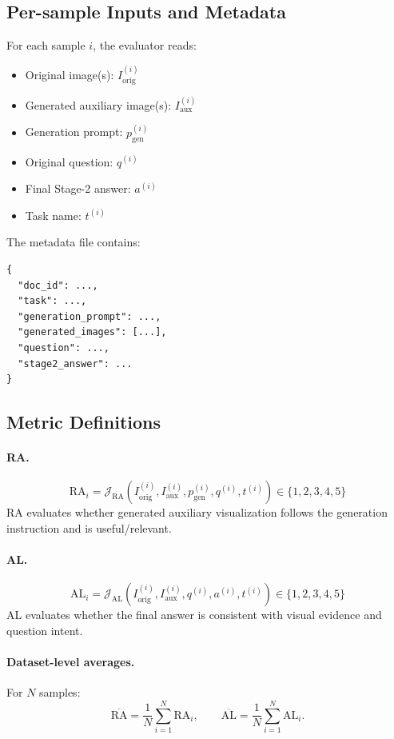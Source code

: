 \documentclass{article}
\theoremstyle{plain}
\theoremstyle{definition}
\theoremstyle{remark}
\begin{document}
\subsection{Per-sample Inputs and Metadata}
For each sample \(i\), the evaluator reads:
\begin{itemize}
\item Original image(s): \(I_{\text{orig}}^{(i)}\)
\item Generated auxiliary image(s): \(I_{\text{aux}}^{(i)}\)
\item Generation prompt: \(p_{\text{gen}}^{(i)}\)
\item Original question: \(q^{(i)}\)
\item Final Stage-2 answer: \(a^{(i)}\)
\item Task name: \(t^{(i)}\)
\end{itemize}

The metadata file contains:
\begin{verbatim}
{
  "doc_id": ...,
  "task": ...,
  "generation_prompt": ...,
  "generated_images": [...],
  "question": ...,
  "stage2_answer": ...
}
\end{verbatim}

\subsection{Metric Definitions}
\paragraph{RA.}
\[
\mathrm{RA}_i = \mathcal{J}_{\mathrm{RA}}\!\left(I_{\text{orig}}^{(i)}, I_{\text{aux}}^{(i)},
p_{\text{gen}}^{(i)}, q^{(i)}, t^{(i)}\right)\in\{1,2,3,4,5\}
\]
RA evaluates whether generated auxiliary visualization follows the generation instruction and is useful/relevant.

\paragraph{AL.}
\[
\mathrm{AL}_i = \mathcal{J}_{\mathrm{AL}}\!\left(I_{\text{orig}}^{(i)}, I_{\text{aux}}^{(i)},
q^{(i)}, a^{(i)}, t^{(i)}\right)\in\{1,2,3,4,5\}
\]
AL evaluates whether the final answer is consistent with visual evidence and question intent.

\paragraph{Dataset-level averages.}
For \(N\) samples:
\[
\overline{\mathrm{RA}}=\frac{1}{N}\sum_{i=1}^N \mathrm{RA}_i,\qquad
\overline{\mathrm{AL}}=\frac{1}{N}\sum_{i=1}^N \mathrm{AL}_i.
\]
\end{document}
